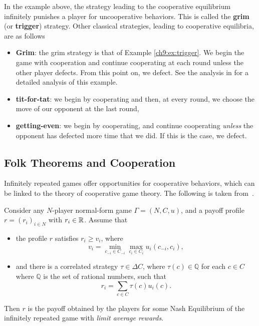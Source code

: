 In the example above, the strategy leading to the cooperative equilibrium
infinitely punishes a player for uncooperative behaviors. This is called
the \textbf{grim} (or \textbf{trigger}) strategy. Other classical
strategies, leading to cooperative equilibria, are as follows
\begin{itemize}
	\item \textbf{Grim}: the grim strategy is that of Example \ref{ch9:ex:trigger}. We begin the game with cooperation and continue cooperating at each round unless the other player defects. From this point on, we defect. See the analysis in \cite[pp. 308-310]{MyGTAO} for a detailed analysis of this example.
    \item \textbf{tit-for-tat}: we begin by cooperating and then, at every
    round, we choose the move of our opponent at the last round,
    \item \textbf{getting-even}: we begin by cooperating, and continue
    cooperating \emph{unless} the opponent has defected more time that
    we did. If this is the case, we defect.
\end{itemize}

\subsection{Folk Theorems and Cooperation}
Infinitely repeated games offer opportunities for cooperative behaviors,
which can be linked to the theory of cooperative game theory.
The following is taken from~\cite[Theorem 6.1.5]{ShLeMSAG}.
\begin{theorem}
\label{ch9:thm:folk1}
Consider any $N$-player normal-form game $\Gamma = (N,C,u)$, and a
payoff profile $r = (r_i)_{i \in N}$ with $r_i \in \mathbb{R}$.
Assume that
\begin{itemize}
    \item the profile $r$ satisfies $r_i \geq v_i$, where
    $$v_i = \min_{c_{-i} \in C_{-i}} \max_{c_i \in C_i}
    u_i(c_{-i}, c_i),$$
    \item and there is a correlated strategy $\tau \in \Delta C$, where
    $\tau(c) \in \mathbb{Q}$ for each $c \in C$ where $\mathbb{Q}$ is the set
    of rational numbers, such that
    $$r_i = \sum_{c \in C} \tau(c) u_i(c).$$
\end{itemize}
Then $r$ is the payoff obtained by the players for some Nash Equilibrium
of the infinitely repeated game with \emph{limit average rewards}.
\end{theorem}

